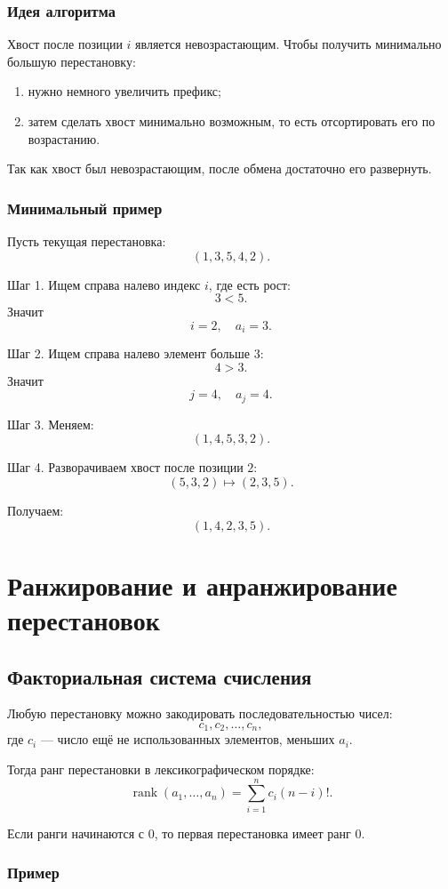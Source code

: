 \documentclass[12pt,a4paper]{article}
\begin{document}
\subsubsection*{Идея алгоритма}

Хвост после позиции $i$ является невозрастающим. Чтобы получить минимально большую перестановку:
\begin{enumerate}
    \item нужно немного увеличить префикс;
    \item затем сделать хвост минимально возможным, то есть отсортировать его по возрастанию.
\end{enumerate}
Так как хвост был невозрастающим, после обмена достаточно его развернуть.

\subsubsection*{Минимальный пример}

Пусть текущая перестановка:
\[
(1,3,5,4,2).
\]

Шаг 1. Ищем справа налево индекс $i$, где есть рост:
\[
3<5.
\]
Значит
\[
i=2,\quad a_i=3.
\]

Шаг 2. Ищем справа налево элемент больше $3$:
\[
4>3.
\]
Значит
\[
j=4,\quad a_j=4.
\]

Шаг 3. Меняем:
\[
(1,4,5,3,2).
\]

Шаг 4. Разворачиваем хвост после позиции $2$:
\[
(5,3,2)\mapsto(2,3,5).
\]

Получаем:
\[
(1,4,2,3,5).
\]

\section{Ранжирование и анранжирование перестановок}

\subsection{Факториальная система счисления}

Любую перестановку можно закодировать последовательностью чисел:
\[
c_1,c_2,\dots,c_n,
\]
где $c_i$ --- число ещё не использованных элементов, меньших $a_i$.

Тогда ранг перестановки в лексикографическом порядке:
\[
\operatorname{rank}(a_1,\dots,a_n)
=
\sum_{i=1}^{n} c_i (n-i)!.
\]

Если ранги начинаются с $0$, то первая перестановка имеет ранг $0$.

\subsubsection*{Пример}
\end{document}
